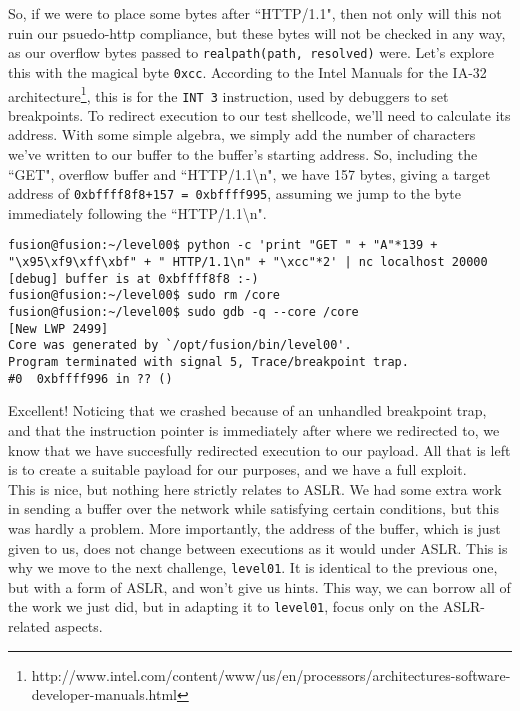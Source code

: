 So, if we were to place some bytes after ``HTTP/1.1", then not only
will this not ruin our psuedo-http compliance, but these bytes will
not be checked in any way, as our overflow bytes passed to \texttt{realpath(path, resolved)} were.
Let's explore this with the magical byte \texttt{0xcc}. According to
the Intel Manuals for the IA-32 architecture\footnote{http://www.intel.com/content/www/us/en/processors/architectures-software-developer-manuals.html}, this
is for the \texttt{INT 3} instruction, used by debuggers to set breakpoints.
To redirect execution to our test shellcode, we'll need to calculate its address.
With some simple algebra, we simply add the number of characters
we've written to our buffer to the buffer's starting address. So, 
including the ``GET", overflow buffer and ``HTTP/1.1\textbackslash n", we have 157
bytes, giving a target address of \texttt{0xbffff8f8+157 = 0xbffff995},
assuming we jump to the byte immediately following the ``HTTP/1.1\textbackslash n".

\begin{lstlisting}
fusion@fusion:~/level00$ python -c 'print "GET " + "A"*139 + "\x95\xf9\xff\xbf" + " HTTP/1.1\n" + "\xcc"*2' | nc localhost 20000
[debug] buffer is at 0xbffff8f8 :-)
fusion@fusion:~/level00$ sudo rm /core
fusion@fusion:~/level00$ sudo gdb -q --core /core
[New LWP 2499]
Core was generated by `/opt/fusion/bin/level00'.
Program terminated with signal 5, Trace/breakpoint trap.
#0  0xbffff996 in ?? ()
\end{lstlisting}

Excellent! Noticing that we crashed because of an unhandled
breakpoint trap, and that the instruction pointer is immediately
after where we redirected to, we know that we have succesfully
redirected execution to our payload. All that is left is to
create a suitable payload for our purposes, and we have
a full exploit.\\

This is nice, but nothing here strictly relates to ASLR. We
had some extra work in sending a buffer over the network while satisfying
certain conditions, but this was hardly a problem. More 
importantly, the address of the buffer, which is just given
to us, does not change between executions as it would under ASLR.
This is why we move to the next challenge, \texttt{level01}. 
It is identical to the previous one, but with a form of ASLR, and 
won't give us hints. This way, we can borrow all of the work
we just did, but in adapting it to \texttt{level01}, focus
only on the ASLR-related aspects.\\

